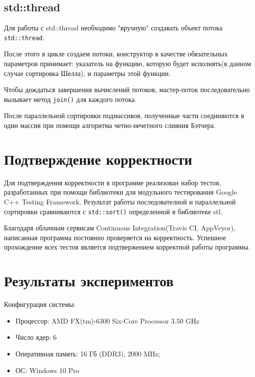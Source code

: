 \documentclass{report}
\begin{document}
\subsection*{std::thread}
Для работы с std::thread необходимо "вручную" создавать объект потока \verb|std::thread|. 
\par После этого в цикле создаем потоки, конструктор в качестве обязательных параметров принимает: указатель на функцию, которую будет исполнять(в данном случае сортировка Шелла), и параметры этой функции.
\par Чтобы дождаться завершения вычислений потоков, мастер-поток последовательно вызывает метод \verb|join()| для каждого потока. 
\par После параллельной сортировки подмассивов, полученные части соединяются в один массив при помощи алгоритма четно-нечетного слияния Бэтчера.
\newpage

\section*{Подтверждение корректности}
Для подтверждения корректности в программе реализован набор тестов, разработанных при помощи библиотеки для модульного тестирования Google C++ Testing Framework. Результат работы последователной и параллельной сортировки сравниваются с \verb|std::sort()| определенной в библиотеке stl.
\par Благодаря облачным сервисам Continuous Integration(Travis CI, AppVeyor), написанная программа постоянно проверяется на корректность. Успешное прохождение всех тестов является подтвержением корректной работы программы. 

\newpage

\section*{Результаты экспериментов}
Конфигурация системы:
\begin{itemize}
\item Процессор: AMD FX(tm)-6300 Six-Core Processor 3.50 GHz
\item Число ядер: 6
\item Оперативная память: 16 Гб (DDR3), 2000 MHz;
\item ОС: Windows 10 Pro
\end{itemize}
\end{document}
